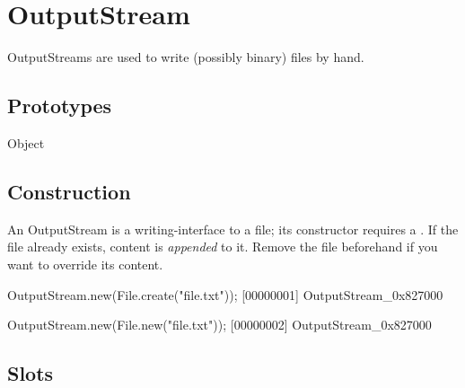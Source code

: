 
\section{OutputStream}

OutputStreams are used to write (possibly binary) files by hand.

\subsection{Prototypes}
\begin{refObjects}
\item[Object]
\end{refObjects}

\subsection{Construction}

An OutputStream is a writing-interface to a file; its constructor
requires a .  If the file already exists, content is
\emph{appended} to it.  Remove the file beforehand if you want to
override its content.

\begin{urbiscript}
OutputStream.new(File.create("file.txt"));
[00000001] OutputStream_0x827000

OutputStream.new(File.new("file.txt"));
[00000002] OutputStream_0x827000
\end{urbiscript}

\subsection{Slots}

